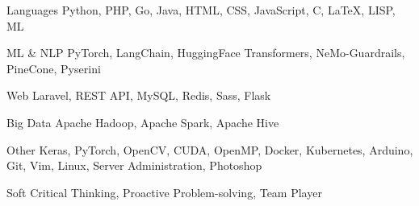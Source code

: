 

\begin{cvskills}

  \cvskill
    {Languages} %
    {Python, PHP, Go, Java, HTML, CSS, JavaScript, C, \LaTeX, LISP, ML} %

  \cvskill
    {ML \& NLP} %
    {PyTorch, LangChain, HuggingFace Transformers, NeMo-Guardrails, PineCone, Pyserini} %

  \cvskill
    {Web} %
    {Laravel, REST API, MySQL, Redis, Sass, Flask} %

  \cvskill
    {Big Data} %
    {Apache Hadoop, Apache Spark, Apache Hive} %

  \cvskill
    {Other} %
    {Keras, PyTorch, OpenCV, CUDA, OpenMP, Docker, Kubernetes, Arduino, Git, Vim, Linux, Server Administration, Photoshop} %

  \cvskill
    {Soft} %
    {Critical Thinking, Proactive Problem-solving, Team Player} %

\end{cvskills}
